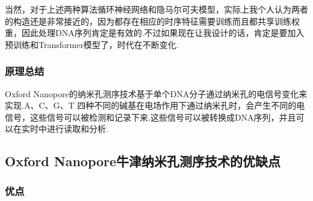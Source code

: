 当然，对于上述两种算法循环神经网络和隐马尔可夫模型，实际上我个人认为两者的构造还是非常接近的，因为都存在相应的时序特征需要训练而且都共享训练权重，因此处理DNA序列肯定是有效的.不过如果现在让我设计的话，肯定是要加入预训练和Transformer模型了，时代在不断变化.




\subsubsection{原理总结}

Oxford Nanopore的纳米孔测序技术基于单个DNA分子通过纳米孔的电信号变化来实现.A、C、G、T 四种不同的碱基在电场作用下通过纳米孔时，会产生不同的电信号，这些信号可以被检测和记录下来.这些信号可以被转换成DNA序列，并且可以在实时中进行读取和分析.


\subsection{Oxford Nanopore牛津纳米孔测序技术的优缺点}

\subsubsection{优点}

